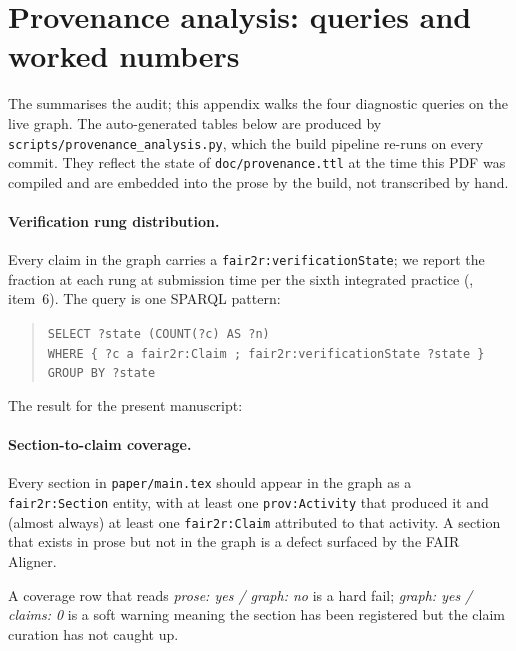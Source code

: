 \section{Provenance analysis: queries and worked numbers}
\label{sec:appendix-provenance-analysis}

The  summarises the
audit; this appendix walks the four diagnostic queries on the live
graph. The auto-generated tables below are produced by
\texttt{scripts/provenance\_analysis.py}, which the build pipeline
re-runs on every commit. They reflect the state of
\texttt{doc/provenance.ttl} at the time this PDF was compiled and
are embedded into the prose by the build, not transcribed by hand.

\paragraph{Verification rung distribution.}
Every claim in the graph carries a
\texttt{fair2r:verificationState}; we report the fraction at each
rung at submission time per the sixth integrated practice
(, item~6). The query is one SPARQL pattern:

\begin{quote}\small
\texttt{SELECT ?state (COUNT(?c) AS ?n)\\
WHERE \{ ?c a fair2r:Claim ; fair2r:verificationState ?state \}\\
GROUP BY ?state}
\end{quote}

\noindent The result for the present manuscript:



\paragraph{Section-to-claim coverage.}
Every section in \texttt{paper/main.tex} should appear in the graph
as a \texttt{fair2r:Section} entity, with at least one
\texttt{prov:Activity} that produced it and (almost always) at least
one \texttt{fair2r:Claim} attributed to that activity. A section
that exists in prose but not in the graph is a defect surfaced by
the FAIR Aligner.



\noindent A coverage row that reads \emph{prose: yes / graph: no} is
a hard fail; \emph{graph: yes / claims: 0} is a soft warning meaning
the section has been registered but the claim curation has not
caught up.

